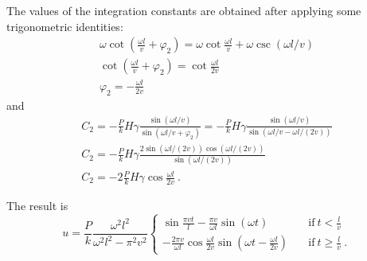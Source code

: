 \begin{Answer}[ref={moving_load}]
The values of the integration constants are obtained after applying some trigonometric identities:
\begin{gather*}
\omega\cot\left(\frac{\omega l}{v}+\varphi_2\right) = \omega\cot\frac{\omega l}{v} + \omega\csc(\omega l/v) \\
\cot\left(\frac{\omega l}{v}+\varphi_2\right) = \cot\frac{\omega l}{2v} \\
\varphi_2 = -\frac{\omega l}{2v}
\end{gather*}
and
\begin{gather*}
C_2 = -\frac{P}{k}H\gamma\frac{\sin(\omega l/v)}{\sin(\omega l/v + \varphi_2)} =
    -\frac{P}{k}H\gamma\frac{\sin(\omega l/v)}{\sin(\omega l/v - \omega l/(2v))} \\[4pt]
C_2 = -\frac{P}{k}H\gamma\frac{2\sin(\omega l/(2v))\cos(\omega l/(2v))}{\sin(\omega l/(2v))} \\[2pt]
C_2 = -2\frac{P}{k}H\gamma\cos\frac{\omega l}{2v}\ .
\end{gather*}

The result is
$$
u = \frac{P}{k}\frac{\omega^2l^2}{\omega^2l^2-\pi^2v^2}
\begin{cases}
\sin\frac{\pi vt}{l} - \frac{\pi v}{\omega l}\sin(\omega t) \quad &\text{if}\ t < \frac{l}{v} \\
-\frac{2\pi v}{\omega l}\cos\frac{\omega l}{2v}\sin(\omega t - \frac{\omega l}{2v}) \quad &\text{if}\ t \geq \frac{l}{v}\ .
\end{cases}
$$

\end{Answer}
